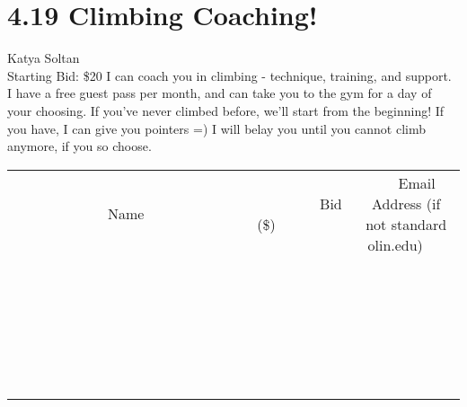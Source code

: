 \documentclass[11pt]{article}
\begin{document}
\section*{4.19 Climbing Coaching!}
Katya Soltan
\\
Starting Bid: \$20
\newline
I can coach you in climbing - technique, training, and support. I have a free guest pass per month, and can take you to the gym for a day of your choosing. If you've never climbed before, we'll start from the beginning! If you have, I can give you pointers =) I will belay you until you cannot climb anymore, if you so choose.
\\[6ex]
\begin{tabular}{c c c}
~~~~~~~~~~~~~Name~~~~~~~~~~~~~ & ~~~~~~~~~Bid (\$)~~~~~~~~~  & ~~~Email Address (if not standard olin.edu)~~~\\
 & & \\
\hline
 & & \\
\hline
 & & \\
\hline
 & & \\
\hline
 & & \\
\hline
 & & \\
\hline
 & & \\
\hline
 & & \\
\hline
 & & \\
\hline
 & & \\
\hline
 & & \\
\hline
 & & \\
\hline
 & & \\
\hline
 & & \\
\hline
 & & \\
\hline
 & & \\
\hline
 & & \\
\hline
 & & \\
\hline
 & & \\
\hline
 & & \\
\hline
 & & \\
\hline
 & & \\
\hline
 & & \\
\hline
 & & \\
\hline
 & & \\
\hline
 & & \\
\hline
\end{tabular}
\newpage
\end{document}
